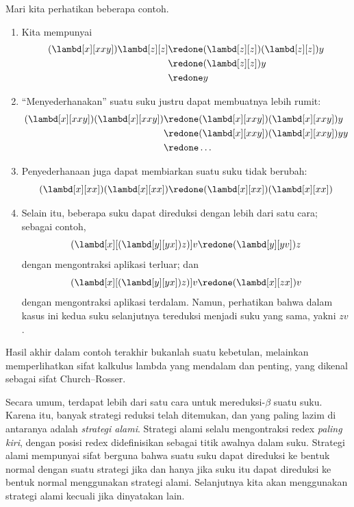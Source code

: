\documentclass[../../../include/open-logic-section]{subfiles}
\begin{document}
Mari kita perhatikan beberapa contoh.
\begin{enumerate}
\item Kita mempunyai
\begin{align*}
(\lambd[x][xxy]) \lambd[z][z] & \redone (\lambd[z][z])(\lambd[z][z]) y \\
& \redone (\lambd[z][z]) y \\
& \redone y
\end{align*}
\item ``Menyederhanakan'' suatu suku justru dapat membuatnya lebih rumit:
\begin{align*}
(\lambd[x][xxy])(\lambd[x][xxy]) & \redone (\lambd[x][xxy])(\lambd[x][xxy])y \\
& \redone (\lambd[x][xxy])(\lambd[x][xxy])yy \\
& \redone \dots
\end{align*}
\item Penyederhanaan juga dapat membiarkan suatu suku tidak berubah:
\[
(\lambd[x][xx])(\lambd[x][xx]) \redone (\lambd[x][xx])(\lambd[x][xx])
\]
\item Selain itu, beberapa suku dapat direduksi dengan lebih dari satu cara;
  sebagai contoh,
\[
(\lambd[x][(\lambd[y][yx]) z)] v \redone (\lambd[y][yv]) z
\]
dengan mengontraksi aplikasi terluar; dan
\[
(\lambd[x][(\lambd[y][yx]) z)] v \redone (\lambd[x][zx]) v
\]
dengan mengontraksi aplikasi terdalam. Namun, perhatikan bahwa dalam kasus ini
kedua suku selanjutnya tereduksi menjadi suku yang sama, yakni $zv$.
\end{enumerate}

Hasil akhir dalam contoh terakhir bukanlah suatu kebetulan, melainkan
memperlihatkan sifat kalkulus lambda yang mendalam dan penting, yang dikenal
sebagai sifat Church--Rosser.

\begin{digress}
  Secara umum, terdapat lebih dari satu cara untuk mereduksi-$\beta$ suatu
  suku. Karena itu, banyak strategi reduksi telah ditemukan, dan yang paling
  lazim di antaranya adalah \emph{strategi alami}. Strategi alami selalu
  mengontraksi redex \emph{paling kiri}, dengan posisi redex didefinisikan
  sebagai titik awalnya dalam suku. Strategi alami mempunyai sifat berguna
  bahwa suatu suku dapat direduksi ke bentuk normal dengan suatu strategi jika
  dan hanya jika suku itu dapat direduksi ke bentuk normal menggunakan
  strategi alami. Selanjutnya kita akan menggunakan strategi alami kecuali
  jika dinyatakan lain.
\end{digress}
\end{document}
